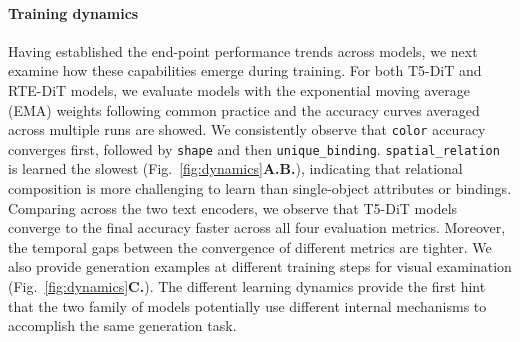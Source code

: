 \documentclass[10pt,twocolumn,letterpaper]{article}
\begin{document}
\paragraph{Training dynamics}
Having established the end-point performance trends across models, we next examine how these capabilities emerge during training. For both T5-DiT and RTE-DiT models, we evaluate models with the exponential moving average (EMA) weights \citep{Karras2024EDM2Analyzing} following common practice and the accuracy curves averaged across multiple runs are showed. We consistently observe that \texttt{color} accuracy converges first, followed by \texttt{shape} and then \texttt{unique\_binding}. \texttt{spatial\_relation} is learned the slowest (Fig.~\ref{fig:dynamics}\textbf{A.B.}), indicating that relational composition is more challenging to learn than single-object attributes or bindings. Comparing across the two text encoders, we observe that T5-DiT models converge to the final accuracy faster across all four evaluation metrics. Moreover, the temporal gaps between the convergence of different metrics are tighter. We also provide generation examples at different training steps for visual examination (Fig.~\ref{fig:dynamics}\textbf{C.}). The different learning dynamics provide the first hint that the two family of models potentially use different internal mechanisms to accomplish the same generation task. 
 


\end{document}

